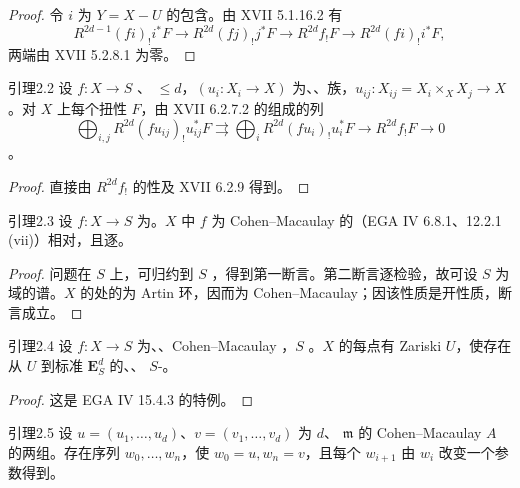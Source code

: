 \begin{proof}
令 $i$ 为 $Y=X-U$ 的包含。由 XVII 5.1.16.2 有
\[R^{2d-1}(fi)_!i^*F\to R^{2d}(fj)_!j^*F\to R^{2d}f_!F\to R^{2d}(fi)_!i^*F,\]
两端由 XVII 5.2.8.1 为零。
\end{proof}
\begin{SGAresult}{引理}{2.2}
设 $f:X\to S$ 、 $\le d$，$(u_i:X_i\to X)$ 为、、族，$u_{ij}:X_{ij}=X_i\times_XX_j\to X$。对 $X$ 上每个扭性 $F$，由 XVII 6.2.7.2 的组成的列
\[\bigoplus_{i,j}R^{2d}(fu_{ij})_!u_{ij}^*F\rightrightarrows\bigoplus_iR^{2d}(fu_i)_!u_i^*F\to R^{2d}f_!F\to0\]
。
\end{SGAresult}
\begin{proof}直接由 $R^{2d}f_!$ 的性及 XVII 6.2.9 得到。\end{proof}
\begin{SGAresult}{引理}{2.3}
设 $f:X\to S$ 为。$X$ 中 $f$ 为 Cohen--Macaulay 的（EGA IV 6.8.1、12.2.1 (vii)）相对，且逐。
\end{SGAresult}
\begin{proof}
问题在 $S$ 上，可归约到 $S$ ，得到第一断言。第二断言逐检验，故可设 $S$ 为域的谱。$X$ 的处的为 Artin 环，因而为 Cohen--Macaulay；因该性质是开性质，断言成立。
\end{proof}
\begin{SGAresult}{引理}{2.4}
设 $f:X\to S$ 为、、Cohen--Macaulay ，$S$ 。$X$ 的每点有 Zariski  $U$，使存在从 $U$ 到标准 $\mathbf E^d_S$ 的、、 $S$-。
\end{SGAresult}
\begin{proof}这是 EGA IV 15.4.3 的特例。\end{proof}
\begin{SGAresult}{引理}{2.5}
设 $u=(u_1,\ldots,u_d)$、$v=(v_1,\ldots,v_d)$ 为 $d$、 $\mathfrak m$ 的 Cohen--Macaulay  $A$ 的两组。存在序列 $w_0,\ldots,w_n$，使 $w_0=u,w_n=v$，且每个 $w_{i+1}$ 由 $w_i$ 改变一个参数得到。
\end{SGAresult}
